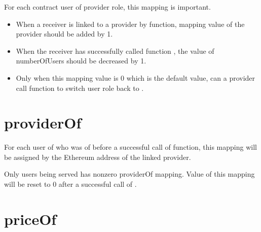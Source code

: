 \documentclass[letterpaper,10pt,english]{sphinxmanual}
\begin{document}
For each contract user of provider role, this mapping is important.
\begin{itemize}
\item {} 
When a receiver is linked to a provider by {\hyperref[\detokenize{index:link}]{}} function, mapping value of the provider should be added by 1.

\item {} 
When the receiver has successfully called function {\hyperref[\detokenize{index:payandleave}]{}}, the value of numberOfUsers should be decreased by 1.

\item {} 
Only when this mapping value is 0 which is the default value, can a provider call function {\hyperref[\detokenize{index:surreceiver}]{}} to switch user role back to .

\end{itemize}


\section{providerOf}
\label{\detokenize{index:providerof}}
%
\begin{sphinxVerbatim}[commandchars=\\\{\}]
     
\end{sphinxVerbatim}

For each user of  who was of  before a successful call of {\hyperref[\detokenize{index:link}]{}} function,
this mapping will be assigned by the Ethereum address of the linked provider.

Only users being served has nonzero providerOf mapping.
Value of this mapping will be reset to 0 after a successful call of {\hyperref[\detokenize{index:payandleave}]{}}.


\section{priceOf}
\label{\detokenize{index:priceof}}
%
\begin{sphinxVerbatim}[commandchars=\\\{\}]
     
\end{sphinxVerbatim}
\end{document}
